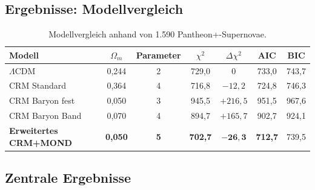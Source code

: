 \documentclass[aps,prd,twocolumn,superscriptaddress,nofootinbib,floatfix]{revtex4-2}
\begin{document}
\subsection{Ergebnisse: Modellvergleich}

\begin{table}[t]
\centering
\caption{Modellvergleich anhand von 1.590 Pantheon+-Supernovae.}
\label{tab:comparison}
\begin{tabular}{lcccccc}
\toprule
\textbf{Modell} & $\Omega_m$ & \textbf{Parameter} & $\chi^2$ & $\Delta\chi^2$ & AIC & BIC \\
\midrule
$\Lambda$CDM & 0,244 & 2 & 729,0 & 0 & 733,0 & 743,7 \\
CRM Standard & 0,364 & 4 & 716,8 & $-12{,}2$ & 724,8 & 746,3 \\
\midrule
CRM Baryon fest & 0,050 & 3 & 945,5 & $+216{,}5$ & 951,5 & 967,6 \\
CRM Baryon Band & 0,070 & 4 & 894,7 & $+165{,}7$ & 902,7 & 924,1 \\
\midrule
\textbf{Erweitertes CRM+MOND} & \textbf{0,050} & \textbf{5} & \textbf{702,7} & $\mathbf{-26{,}3}$ & \textbf{712,7} & 739,5 \\
\bottomrule
\end{tabular}
\end{table}

\subsection{Zentrale Ergebnisse}
\end{document}
